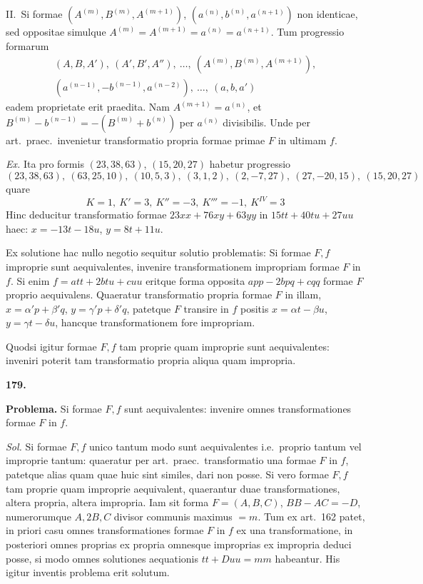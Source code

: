 \documentclass[12pt,a4paper]{article}
\theoremstyle{plain}
\theoremstyle{definition}
\theoremstyle{remark}
\begin{document}
II.\ Si formae $(A^{(m)},B^{(m)},A^{(m+1)})$, $(a^{(n)},b^{(n)},a^{(n+1)})$ non identicae, sed oppositae simulque $A^{(m)}=A^{(m+1)}=a^{(n)}=a^{(n+1)}$. Tum progressio formarum
\begin{gather*}
(A,B,A'),\ (A',B',A''),\ \ldots,\ (A^{(m)},B^{(m)},A^{(m+1)}),\\
(a^{(n-1)},-b^{(n-1)},a^{(n-2)}),\ \ldots,\ (a,b,a')
\end{gather*}
eadem proprietate erit praedita. Nam $A^{(m+1)}=a^{(n)}$, et $B^{(m)}-b^{(n-1)}=-(B^{(m)}+b^{(n)})$ per $a^{(n)}$ divisibilis. Unde per art.\ praec.\ invenietur transformatio propria formae primae $F$ in ultimam $f$.

\textit{Ex.} Ita pro formis $(23,38,63)$, $(15,20,27)$ habetur progressio
\[(23,38,63),\ (63,25,10),\ (10,5,3),\ (3,1,2),\ (2,-7,27),\ (27,-20,15),\ (15,20,27)\]
quare
\[K=1,\ K'=3,\ K''=-3,\ K'''=-1,\ K^{IV}=3\]
Hinc deducitur transformatio formae $23xx+76xy+63yy$ in $15tt+40tu+27uu$ haec: $x=-13t-18u$, $y=8t+11u$.

Ex solutione hac nullo negotio sequitur solutio problematis: Si formae $F,f$ improprie sunt aequivalentes, invenire transformationem impropriam formae $F$ in $f$. Si enim $f=att+2btu+cuu$ eritque forma opposita $app-2bpq+cqq$ formae $F$ proprio aequivalens. Quaeratur transformatio propria formae $F$ in illam, $x=\alpha'p+\beta'q$, $y=\gamma'p+\delta'q$, patetque $F$ transire in $f$ positis $x=\alpha t-\beta u$, $y=\gamma t-\delta u$, hancque transformationem fore impropriam.

Quodsi igitur formae $F,f$ tam proprie quam improprie sunt aequivalentes: inveniri poterit tam transformatio propria aliqua quam impropria.

\textbf{179.}

\textbf{Problema.} Si formae $F,f$ sunt aequivalentes: invenire omnes transformationes formae $F$ in $f$.

\textit{Sol.} Si formae $F,f$ unico tantum modo sunt aequivalentes i.e.\ proprio tantum vel improprie tantum: quaeratur per art.\ praec.\ transformatio una formae $F$ in $f$, patetque alias quam quae huic sint similes, dari non posse. Si vero formae $F,f$ tam proprie quam improprie aequivalent, quaerantur duae transformationes, altera propria, altera impropria. Iam sit forma $F=(A,B,C)$, $BB-AC=-D$, numerorumque $A,2B,C$ divisor communis maximus $=m$. Tum ex art.\ 162 patet, in priori casu omnes transformationes formae $F$ in $f$ ex una transformatione, in posteriori omnes proprias ex propria omnesque improprias ex impropria deduci posse, si modo omnes solutiones aequationis $tt+Duu=mm$ habeantur. His igitur inventis problema erit solutum.
\end{document}
